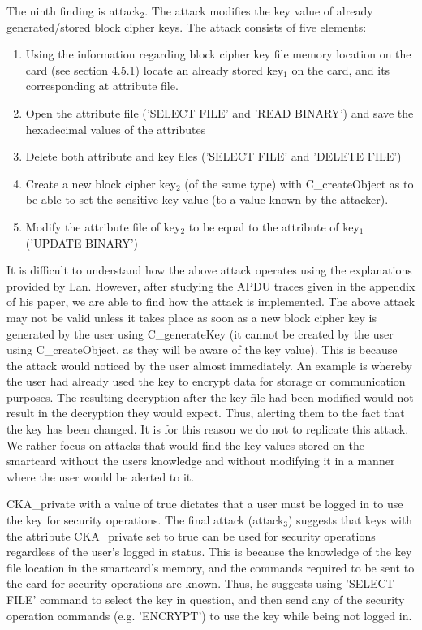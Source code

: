 \documentclass[bsc,frontabs,twoside,singlespacing,parskip,deptreport]{infthesis}     %
\begin{document}
The ninth finding is attack$_2$. The attack modifies the key value of already generated/stored block cipher keys. The attack consists of five elements:
\begin{enumerate}
\item Using the information regarding block cipher key file memory location on the card (see section 4.5.1) locate an already stored key$_1$ on the card, and its corresponding at attribute file.
\item Open the attribute file ('SELECT FILE' and 'READ BINARY') and save the hexadecimal values of the attributes
\item Delete both attribute and key files ('SELECT FILE' and 'DELETE FILE')
\item Create a new block cipher key$_2$ (of the same type) with C\_createObject as to be able to set the sensitive key value (to a value known by the attacker).
\item Modify the attribute file of key$_2$ to be equal to the attribute of key$_1$ ('UPDATE BINARY')
\end{enumerate}

It is difficult to understand how the above attack operates using the explanations provided by Lan. However, after studying the APDU traces given in the appendix of his paper, we are able to find how the attack is implemented. The above attack may not be valid unless it takes place as soon as a new block cipher key is generated by the user using C\_generateKey (it cannot be created by the user using C\_createObject, as they will be aware of the key value). This is because the attack would noticed by the user almost immediately. An example is whereby the user had already used the key to encrypt data for storage or communication purposes. The resulting decryption after the key file had been modified would not result in the decryption they would expect. Thus, alerting them to the fact that the key has been changed. It is for this reason we do not to replicate this attack. We rather focus on attacks that would find the key values stored on the smartcard without the users knowledge and without modifying it in a manner where the user would be alerted to it.

CKA\_private with a value of true dictates that a user must be logged in to use the key for security operations. The final attack (attack$_3$) suggests that keys with the attribute CKA\_private set to true can be used for security operations regardless of the user's logged in status. This is because the knowledge of the key file location in the smartcard's memory, and the commands required to be sent to the card for security operations are known. Thus, he suggests using 'SELECT FILE' command to select the key in question, and then send any of the security operation commands (e.g. 'ENCRYPT') to use the key while being not logged in. 
\end{document}
